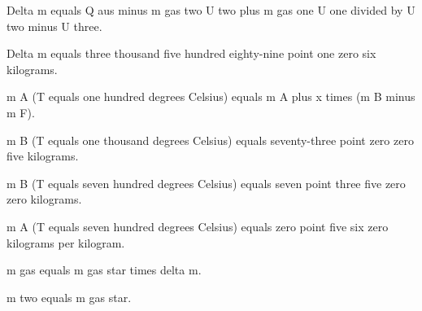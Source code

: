 Delta m equals Q aus minus m gas two U two plus m gas one U one divided by U two minus U three.

Delta m equals three thousand five hundred eighty-nine point one zero six kilograms.

m A (T equals one hundred degrees Celsius) equals m A plus x times (m B minus m F).

m B (T equals one thousand degrees Celsius) equals seventy-three point zero zero five kilograms.

m B (T equals seven hundred degrees Celsius) equals seven point three five zero zero kilograms.

m A (T equals seven hundred degrees Celsius) equals zero point five six zero kilograms per kilogram.

m gas equals m gas star times delta m.

m two equals m gas star.
